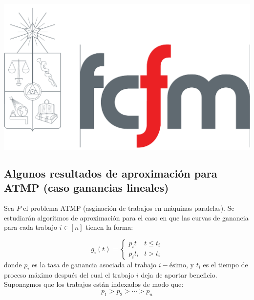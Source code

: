 \documentclass[10pt]{article}
\theoremstyle{plain}
\theoremstyle{definition}
\newcommand{\sca}{Escriba Uno}
\newcommand{\scb}{Escriba Dos}
\newcommand{\scc}{Escriba Tres}
\newcommand{\fecha}{5 de noviembre 2018 }
\begin{document}
\vspace*{-1.2 cm}
\begin{flushleft}
\includegraphics[scale=0.15]{fcfm}
\end{flushleft}
\bigskip


\subsection{Algunos resultados de aproximación para ATMP (caso ganancias lineales)}

Sea $P$ el problema ATMP (asginaci\'on de trabajos en m\'aquinas paralelas). Se estudiar\'an algoritmos de aproximaci\'on para el caso en que las curvas de ganancia para cada trabajo $i \in [n]$ tienen la forma:


$$
g_i(t) = \left\{\begin{array}{lr}
p_i t & t \leq t_i \\
p_i t_i & t>t_i
\end{array}\right.
$$
donde $p_i$ es la tasa de ganancia asociada al trabajo $i-$\'esimo, y $t_i$ es el tiempo de proceso m\'aximo despu\'es del cual el trabajo $i$ deja de aportar beneficio. Suponagmos que los trabajos est\'an indexados de modo que:
\begin{equation}
\label{eq:trabajosOrd}
p_1 > p_2 > \cdots > p_n
\end{equation}
\end{document}
